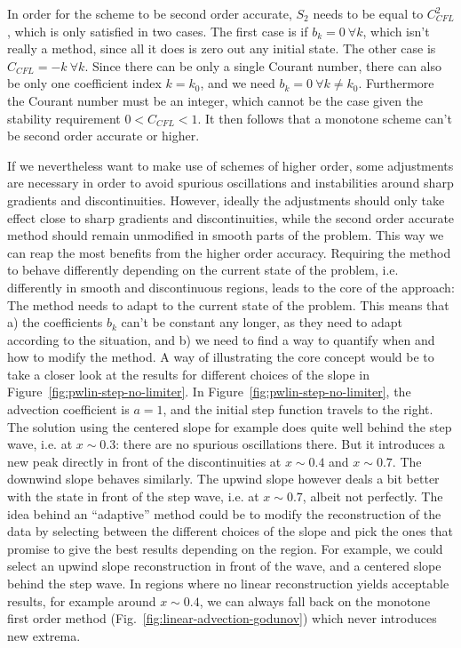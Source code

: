 In order for the scheme to be second order accurate, $S_2$ needs to be equal to $C_{CFL}^2$, which
is only satisfied in two cases. The first case is if $b_k = 0\ \forall k$, which isn't really a
method, since all it does is zero out any initial state. The other case is $C_{CFL} = -k \ \forall
k$. Since there can be only a single Courant number, there can also be only one coefficient index
$k = k_0$, and we need $b_k = 0 \ \forall k \neq k_0$. Furthermore the Courant number must be an
integer, which cannot be the case given the stability requirement $0 < C_{CFL} < 1$. It then
follows that a monotone scheme can't be second order accurate or higher.

If we nevertheless want to make use of schemes of higher order, some adjustments are necessary in
order to avoid spurious oscillations and instabilities around sharp gradients and discontinuities.
However, ideally the adjustments should only take effect close to sharp gradients and
discontinuities, while the second order accurate method should remain unmodified in smooth parts of
the problem. This way we can reap the most benefits from the higher order accuracy. Requiring the
method to behave differently depending on the current state of the problem, i.e. differently in
smooth and discontinuous regions, leads to the core of the approach: The method needs to adapt to
the current state of the problem. This means that a) the coefficients $b_k$ can't be constant any
longer, as they need to adapt according to the situation, and b) we need to find a way to quantify
when and how to modify the method. A way of illustrating the core concept would be to take a closer
look at the results for different choices of the slope in Figure~\ref{fig:pwlin-step-no-limiter}.
In Figure~\ref{fig:pwlin-step-no-limiter}, the advection coefficient is $a = 1$, and the initial
step function travels to the right. The solution using the centered slope for example does quite
well behind the step wave, i.e. at $x \sim 0.3$: there are no spurious oscillations there. But it
introduces a new peak directly in front of the discontinuities at $x \sim 0.4$ and $x \sim 0.7$.
The downwind slope behaves similarly. The upwind slope however deals a bit better with the state in
front of the step wave, i.e. at $x \sim 0.7$, albeit not perfectly. The idea behind an ``adaptive''
method could be to modify the reconstruction of the data by selecting between the different choices
of the slope and pick the ones that promise to give the best results depending on the region. For
example, we could select an upwind slope reconstruction in front of the wave, and a centered slope
behind the step wave. In regions where no linear reconstruction yields acceptable results, for
example around $x \sim 0.4$, we can always fall back on the monotone first order method
(Fig.~\ref{fig:linear-advection-godunov}) which never introduces new extrema.


